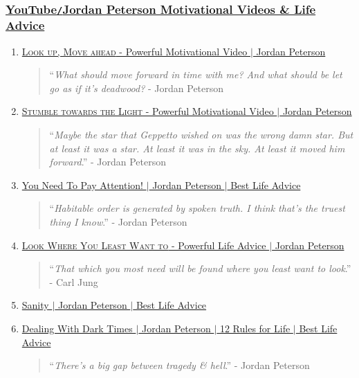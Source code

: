 \documentclass{article}
\begin{document}
\subsubsection{\href{https://www.youtube.com/playlist?list=PLi3n6z1voQ1arCpQ89izFMwk7lsFrFnq0}{YouTube{\tt/}Jordan Peterson Motivational Videos \& Life Advice}}
\begin{enumerate}
	\item \href{https://www.youtube.com/watch?v=MUmKnW1j2Xs}{\textsc{Look up, Move ahead} - Powerful Motivational Video $|$ Jordan Peterson}    
	\begin{quotation}
		``{\it What should move forward in time with me? And what should be let go as if it's deadwood?} - Jordan Peterson
	\end{quotation}
	\item \href{https://www.youtube.com/watch?v=PrIrZRd0pGE}{\textsc{Stumble towards the Light} - Powerful Motivational Video $|$ Jordan Peterson}    
	\begin{quotation}
		``{\it Maybe the star that Geppetto wished on was the wrong damn star. But at least it was a star. At least it was in the sky. At least it moved him forward}.'' - Jordan Peterson
	\end{quotation}
	\item \href{https://www.youtube.com/watch?v=L0FCwYKkZ4o}{You Need To Pay Attention! $|$ Jordan Peterson $|$ Best Life Advice}    
	\begin{quotation}
		``{\it Habitable order is generated by spoken truth. I think that's the truest thing I know}.'' - Jordan Peterson
	\end{quotation}
	\item \href{https://www.youtube.com/watch?v=LjIAzKo62MQ}{\textsc{Look Where You Least Want to} - Powerful Life Advice $|$ Jordan Peterson}    
	\begin{quotation}
		``{\it That which you most need will be found where you least want to look}.'' - Carl Jung
	\end{quotation}
	\item \href{https://www.youtube.com/watch?v=_g6Aqrl3fFM}{Sanity $|$ Jordan Peterson $|$ Best Life Advice}
	\item \href{https://www.youtube.com/watch?v=3EGIlQyEwvE}{Dealing With Dark Times $|$ Jordan Peterson $|$ 12 Rules for Life $|$ Best Life Advice}    
	\begin{quotation}
		``{\it There's a big gap between tragedy \& hell}.'' - Jordan Peterson
	\end{quotation}

\end{enumerate}
\end{document}
